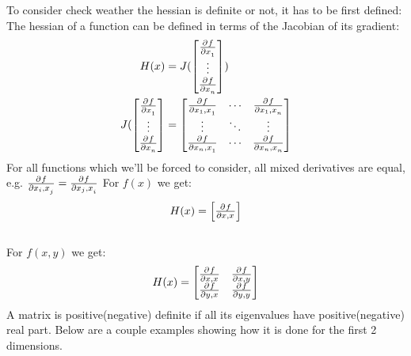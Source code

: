To consider check weather the hessian is definite or not, it has to be first defined:
{
    The hessian of a function can be defined in terms of the Jacobian of its gradient:
    \begin{equation}
        \begin{aligned}
            H(x) &= J(\begin{bmatrix}
                \frac{\partial^{}f}{\partial x_1^{}} \\ \vdots \\ \frac{\partial^{}f}{\partial x_n^{}}
            \end{bmatrix})\\
            J(\begin{bmatrix}
                \frac{\partial^{}f}{\partial x_1^{}} \\ \vdots \\ \frac{\partial^{}f}{\partial x_n^{}}
            \end{bmatrix}&= \begin{bmatrix}
            \frac{\partial^{}f}{\partial x_1,x_1^{}} & \cdots & \frac{\partial^{}f}{\partial x_1,x_n^{}}\\
            \vdots & \ddots & \vdots\\
            \frac{\partial^{}f}{\partial x_n,x_1^{}} & \cdots &\frac{\partial^{}f}{\partial x_n,x_n^{}}\\
            \end{bmatrix}
        \end{aligned}
    \end{equation}
    For all functions which we'll be forced to consider, all mixed derivatives are equal, e.g. $\frac{\partial^{}f}{\partial x_i,x_j^{}} = \frac{\partial^{}f}{\partial x_j,x_i^{}}$
    {
        For $f(x)$ we get:
         \begin{equation}
            H(x) = \begin{bmatrix}
                \frac{\partial^{}f}{\partial x,x^{}}
            \end{bmatrix}
        \end{equation}
        \\
        For $f(x,y)$ we get:
         \begin{equation}
            H(x) = \begin{bmatrix}
                \frac{\partial^{}f}{\partial x,x^{}} & \frac{\partial^{}f}{\partial x,y^{}} \\
                \frac{\partial^{}f}{\partial y,x^{}} & \frac{\partial^{}f}{\partial y,y^{}}
            \end{bmatrix}
        \end{equation}
    }
}
A matrix is positive(negative) definite if all its eigenvalues have positive(negative) real part. Below are a couple examples showing how it is done for the first 2 dimensions.

